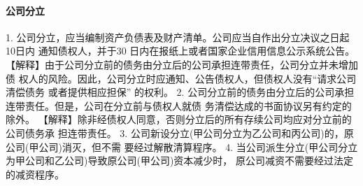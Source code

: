 \documentclass[UTF8,12pt]{ctexart}
\numberwithin{equation}{section} %
\numberwithin{figure}{section}
\numberwithin{table}{section}
\begin{document}
	\paragraph{公司分立}
	1. 公司分立，应当编制资产负债表及财产清单。公司应当自作出分立决议之日起10日内 通知债权人，并于30 日内在报纸上或者国家企业信用信息公示系统公告。
	【解释】由于公司分立前的债务由分立后的公司承担连带责任，公司分立并未增加债 权人的风险。因此，公司分立时应通知、公告债权人，但债权人没有“请求公司清偿债务 或者提供相应担保” 的权利。
	2. 公司分立前的债务由分立后的公司承担连带责任。但是，公司在分立前与债权人就债 务清偿达成的书面协议另有约定的除外。
	【解释】除非经债权人同意，否则分立后的所有存续公司均应对分立前的公司债务承 担连带责任。
	3. 公司新设分立(甲公司分立为乙公司和丙公司)的，原公司(甲公司)消灭，但不需 要经过解散清算程序。
	4. 当公司派生分立(甲公司分立为甲公司和乙公司)导致原公司(甲公司)资本减少时， 原公司减资不需要经过法定的减资程序。
	
\end{document}
